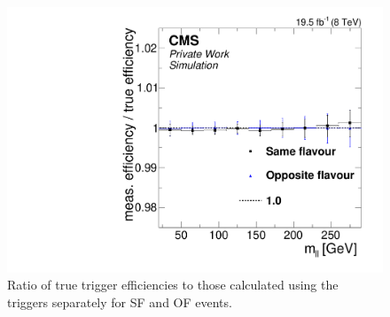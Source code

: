 \begin{figure}
\begin{center}
\includegraphics[scale=0.35]{plots/BG/trigger/Triggereff_AlphaTSyst_PFHT_HighHTExclusive_Full2012_Mll_None.pdf}
\caption{Ratio of true trigger efficiencies to those calculated using the \HT triggers separately for SF and OF events.}
\label{fig:triggerEffBias}
\end{center}
\end{figure}
